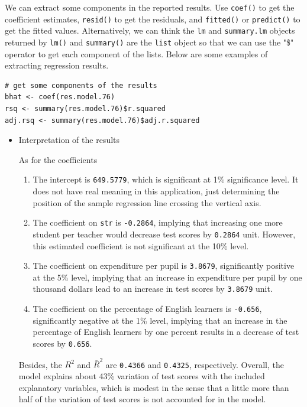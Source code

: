 \documentclass[11pt]{article}
\begin{document}
We can extract some components in the reported results. Use \texttt{coef()} to
get the coefficient estimates, \texttt{resid()} to get the residuals, and \texttt{fitted()}
or \texttt{predict()} to get the fitted values. Alternatively, we can think the
\texttt{lm} and \texttt{summary.lm} objects returned by \texttt{lm()} and \texttt{summary()} are the
\texttt{list} object so that we can use the "\$" operator to get each component of
the lists. Below are some examples of extracting regression results.

\begin{verbatim}
# get some components of the results
bhat <- coef(res.model.76)
rsq <- summary(res.model.76)$r.squared
adj.rsq <- summary(res.model.76)$adj.r.squared
\end{verbatim}

\begin{itemize}
\item Interpretation of the results
\label{sec:org08474ce}

As for the coefficients
\begin{enumerate}
\item The intercept is \texttt{649.5779}, which is significant at
1\% significance level. It does not have real meaning in this
application, just determining the position of the sample regression
line crossing the vertical axis.
\item The coefficient on \texttt{str} is \texttt{-0.2864}, implying that
increasing one more student per teacher would decrease test scores
by \texttt{0.2864} unit. However, this estimated
coefficient is not significant at the 10\% level.
\item The coefficient on expenditure per pupil is \texttt{3.8679},
significantly positive at the 5\% level, implying that an increase in
expenditure per pupil by one thousand dollars lead to an increase
in test scores by \texttt{3.8679} unit.
\item The coefficient on the percentage of English learners is
\texttt{-0.656}, significantly negative at the 1\% level,
implying that an increase in the percentage of English learners by
one percent results in a decrease of test scores by
\texttt{0.656}.
\end{enumerate}

Besides, the \(R^2\) and \(\bar{R}^2\) are \texttt{0.4366} and
\texttt{0.4325}, respectively. Overall, the model explains
about 43\% variation of test scores with the included explanatory
variables, which is modest in the sense that a little more than half
of the variation of test scores is not accounted for in the model.
\end{itemize}
\end{document}
